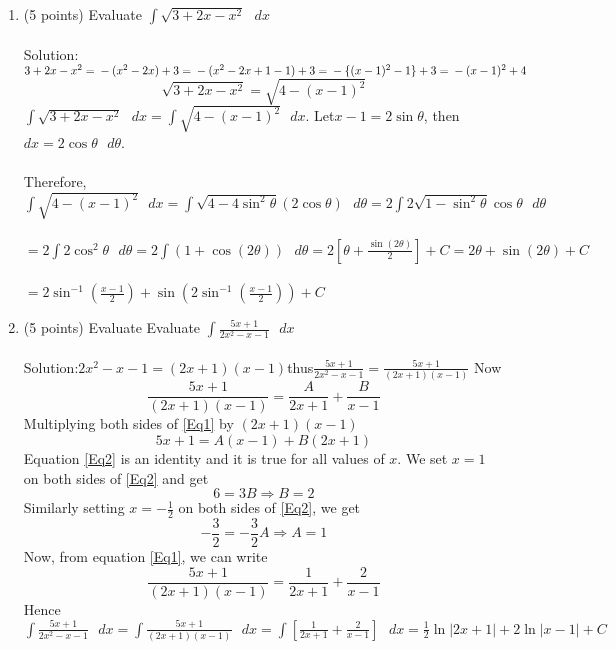 \documentclass[paper=a4, fontsize=11pt]{scrartcl} %
\numberwithin{equation}{section} %
\numberwithin{figure}{section} %
\numberwithin{table}{section} %
\begin{document}
\begin{enumerate}
\setlength{\itemsep}{0.45in}
\item (5 points) Evaluate $\int \sqrt{3+2x-x^2} \text{  } d x$\\\\
Solution:\hspace{3mm} $3+2x-x^2={}-(x^2-2x)+3={}-(x^2-2x+1-1)+3\\={}-\{(x-1)^2-1\}+3={}-(x-1)^2+4$
$$\sqrt{3+2x-x^2}=\sqrt{4-(x-1)^2}$$
$\int \sqrt{3+2x-x^2} \text{  } d x=\int \sqrt{4-(x-1)^2} \text{  } d x$.\hspace{3mm} Let\hspace{3mm}$x-1=2\sin\theta$,\hspace{3mm} then\hspace{3mm} $dx=2\cos\theta \text{ } d\theta$.\\\\ Therefore,\hspace{3mm}$\int \sqrt{4-(x-1)^2} \text{  } d x=\int  \sqrt{4-4\sin^2\theta}(2\cos\theta)\text{ }d\theta=2\int2\sqrt{1-\sin^2\theta}\cos\theta\text{ }d\theta $\\\\
$=2\int 2\cos^2\theta\text{ }d\theta=2\int(1+\cos(2\theta))\text{ }d\theta=2[\theta+\frac{\sin(2\theta)}{2}]+C=2\theta+\sin(2\theta)+C$\\\\
$=2\sin^{-1}(\frac{x-1}{2})+\sin\left(2\sin^{-1}(\frac{x-1}{2})\right)+C$
\vspace{0.125in}
\item (5 points) Evaluate Evaluate $\int \frac{5x+1}{2x^2-x-1} \text{  } d x$\\\\
Solution:\hspace{3mm}$2x^2-x-1=(2x+1)(x-1)$\hspace{3mm}thus\hspace{3mm}$\frac{5x+1}{2x^2-x-1}=\frac{5x+1}{(2x+1)(x-1)}$ \hspace{2mm} Now
\begin{equation}
\frac{5x+1}{(2x+1)(x-1)}=\frac{A}{2x+1}+\frac{B}{x-1}\label{Eq1}
\end{equation}
Multiplying both sides of \eqref{Eq1} by \hspace{2mm}$(2x+1)(x-1)$
\begin{equation}
5x+1=A(x-1)+B(2x+1)\label{Eq2}
\end{equation}
Equation \eqref{Eq2} is an identity and it is true for all values of $x$. We set $x=1$ on both sides of \eqref{Eq2} and get
$$6=3B\Rightarrow B=2$$
Similarly setting $x=-\frac12$ on both sides of \eqref{Eq2}, we get
$$-\frac32=-\frac32 A\Rightarrow A=1$$
Now, from equation \eqref{Eq1}, we can write
\begin{equation}
\frac{5x+1}{(2x+1)(x-1)}=\frac{1}{2x+1}+\frac{2}{x-1}\label{Eq1}
\end{equation}
Hence$\int \frac{5x+1}{2x^2-x-1} \text{  } d x=\int \frac{5x+1}{(2x+1)(x-1)} \text{  } d x=\int[\frac{1}{2x+1}+\frac{2}{x-1}]\text{  } d x=\frac12\ln|2x+1|+2\ln|x-1|+C$

\end{enumerate}

\end{document}
